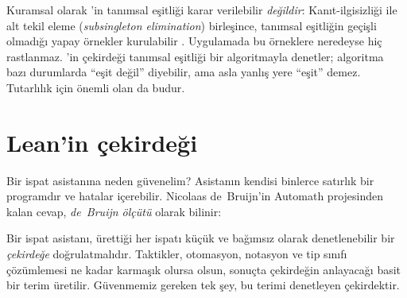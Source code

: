 \begin{dikkat}
Kuramsal olarak \Lean{}'in tanımsal eşitliği karar verilebilir
\emph{değildir}: Kanıt-ilgisizliği ile alt tekil eleme
(\emph{subsingleton elimination}) birleşince, tanımsal eşitliğin geçişli
olmadığı yapay örnekler kurulabilir \citep{carneiro2019}. Uygulamada bu
örneklere neredeyse hiç rastlanmaz. \Lean{}'in çekirdeği tanımsal eşitliği
bir algoritmayla denetler; algoritma bazı durumlarda ``eşit değil''
diyebilir, ama asla yanlış yere ``eşit'' demez. Tutarlılık için önemli
olan da budur.
\end{dikkat}

\section{Lean'in çekirdeği}\label{sec:cekirdek}

Bir ispat asistanına neden güvenelim? Asistanın kendisi binlerce satırlık
bir programdır ve hatalar içerebilir. Nicolaas de~Bruijn'in Automath
projesinden \citep{debruijn1970} kalan cevap, \emph{de~Bruijn ölçütü}
olarak bilinir:

\begin{onemlifikir}
Bir ispat asistanı, ürettiği her ispatı küçük ve bağımsız olarak
denetlenebilir bir \emph{çekirdeğe} doğrulatmalıdır. Taktikler, otomasyon,
notasyon ve tip sınıfı çözümlemesi ne kadar karmaşık olursa olsun, sonuçta
çekirdeğin anlayacağı basit bir terim üretilir. Güvenmemiz gereken tek
şey, bu terimi denetleyen çekirdektir.
\end{onemlifikir}

